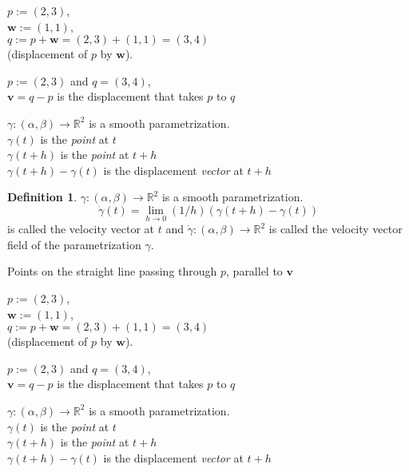 \documentclass[twocolumn,20pt,fleqn]{extarticle}
\newcommand{\sep}{\vspace{0.5cm}}
\theoremstyle{plain}
\theoremstyle{definition}
\newtheorem*{definition}{Definition}
\theoremstyle{remark}
\begin{document}
\clearpage



$p := (2,3)$,\\ $\mathbf{w} := (1,1)$,\\ $q:=p + \mathbf{w} = (2,3) + (1,1) = (3,4)$ \\ (displacement of $p$ by $\mathbf{w}$).

\sep
$p := (2,3)$ and $q=(3,4)$,\\
$\mathbf{v}= q - p$ is the displacement that takes $p$ to $q$ 
\sep

$\gamma : (\alpha,\beta) \to \mathbb{R}^2$ is a smooth parametrization.\\
$\gamma(t)$ is the \emph{point} at $t$\\
$\gamma(t+h)$ is the \emph{point} at $t+h$\\
$\gamma(t+h)-\gamma(t)$ is the displacement \emph{vector} at $t+h$\\



\begin{definition}
$\gamma : (\alpha,\beta) \to \mathbb{R}^2$ is a smooth parametrization.
\[\dot{\gamma}(t) = \lim_{h\to 0} (1/h)(\gamma(t+h) - \gamma(t))\]
is called the velocity vector at $t$ and $\dot{\gamma} : (\alpha, \beta) \to \mathbb{R}^2$ is called the velocity vector field of the parametrization $\gamma$.
\end{definition}
\newpage
Points on the straight line passing through $p$, parallel to $\mathbf{v}$


\clearpage



$p := (2,3)$,\\ $\mathbf{w} := (1,1)$,\\ $q:=p + \mathbf{w} = (2,3) + (1,1) = (3,4)$ \\ (displacement of $p$ by $\mathbf{w}$).

\sep
$p := (2,3)$ and $q=(3,4)$,\\
$\mathbf{v}= q - p$ is the displacement that takes $p$ to $q$ 
\sep

$\gamma : (\alpha,\beta) \to \mathbb{R}^2$ is a smooth parametrization.\\
$\gamma(t)$ is the \emph{point} at $t$\\
$\gamma(t+h)$ is the \emph{point} at $t+h$\\
$\gamma(t+h)-\gamma(t)$ is the displacement \emph{vector} at $t+h$\\
\end{document}
